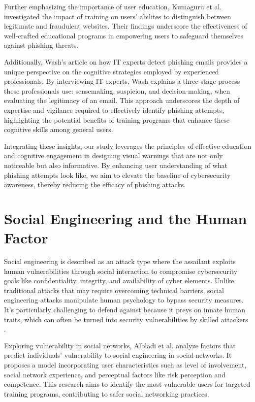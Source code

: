 \documentclass[
  a4paper,  %
  twoside,  %
  bibliography=totoc,
  headsepline,
  cleardoublepage=empty,
  parskip=half,
  draft=false
]{scrbook}
\begin{document}
Further emphasizing the importance of user education, Kumaguru et al. \cite{kumaraguru} investigated the impact of training on users' abilites to distinguish between legitimate and fraudulent websites. Their findings underscore the effectiveness of well-crafted educational programs in empowering users to safeguard themselves against phishing threats. 

Additionally, Wash's article \cite{wash} on how IT experts detect phishing emails provides a unique perspective on the cognitive strategies employed by experienced professionals. By interviewing IT experts, Wash explains a three-stage process these professionals use: sensemaking, suspicion, and decision-making, when evaluating the legitimacy of an email. This approach underscores the depth of expertise and vigilance required to effectively identify phishing attempts, highlighting the potential benefits of training programs that enhance these cognitive skills among general users.

Integrating these insights, our study leverages the principles of effective education and cognitive engagement in designing visual warnings that are not only noticeable but also informative. By enhancing user understanding of what phishing attempts look like, we aim to elevate the baseline of cybersecurity awareness, thereby reducing the efficacy of phishing attacks.

\section{Social Engineering and the Human Factor}
Social engineering is described as an attack type where the assailant exploits human vulnerabilities through social interaction to compromise cybersecurity goals like confidentiality, integrity, and availability of cyber elements. Unlike traditional attacks that may require overcoming technical barriers, social engineering attacks manipulate human psychology to bypass security measures. It's particularly challenging to defend against because it preys on innate human traits, which can often be turned into security vulnerabilities by skilled attackers \cite{Wang2021}.

Exploring vulnerability in social networks, Albladi et al. \cite{albladi} analyze factors that predict individuals' vulnerability to social engineering in social networks. It proposes a model incorporating user characteristics such as level of involvement, social network experience, and perceptual factors like risk perception and competence. This research aims to identify the most vulnerable users for targeted training programs, contributing to safer social networking practices.
\end{document}
